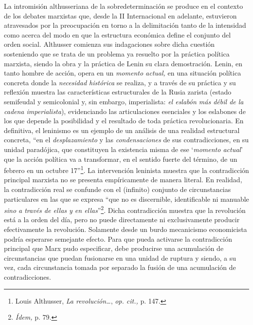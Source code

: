 La intromisión althusseriana de la sobredeterminación se produce en el contexto de los debates marxistas que, desde la II Internacional en adelante, estuvieron atravesados por la preocupación en torno a la delimitación tanto de la intensidad como acerca del modo en que la estructura económica define el conjunto del orden social. Althusser comienza sus indagaciones sobre dicha cuestión sosteniendo que se trata de un problema ya resuelto por la práctica política marxista, siendo la obra y la práctica de Lenin su clara demostración. Lenin, en tanto hombre de acción, opera en un \emph{momento actual,} en una situación política concreta donde la \emph{necesidad histórica} se realiza, y a través de su práctica y su reflexión muestra las características estructurales de la Rusia zarista (estado semifeudal y semicolonial y, sin embargo, imperialista: \emph{el eslabón más débil de la cadena imperialista}), evidenciando las articulaciones esenciales y los eslabones de los que depende la posibilidad y el resultado de toda práctica revolucionaria. En definitiva, el leninismo es un ejemplo de un análisis de una realidad estructural concreta, \enquote{en el \emph{desplazamiento} y las \emph{condensaciones} de sus contradicciones, en su unidad paradójica, que constituyen la existencia misma de ese \enquote{\emph{momento actual}} que la acción política va a transformar, en el sentido fuerte del término, de un febrero en un octubre 17}\footnote{Louis Althusser, \emph{La revolución\ldots{}}, \emph{op. cit.,} p. 147.}. La intervención leninista muestra que la contradicción principal marxista no se presenta empíricamente de manera literal. En realidad, la contradicción real se confunde con el (infinito) conjunto de circunstancias particulares en las que se expresa \enquote{que no es discernible, identificable ni manuable \emph{sino a través de ellas y en ellas}}\footnote{\emph{Ídem,} p. 79.}. Dicha contradicción muestra que la revolución está a la orden del día, pero no puede directamente ni exclusivamente producir efectivamente la revolución. Solamente desde un burdo mecanicismo economicista podría esperarse semejante efecto. Para que pueda activarse la contradicción principal que Marx pudo especificar, debe producirse una acumulación de circunstancias  que puedan fusionarse en una unidad de ruptura y siendo, a su vez, cada circunstancia tomada por separado la fusión de una acumulación de contradicciones.

